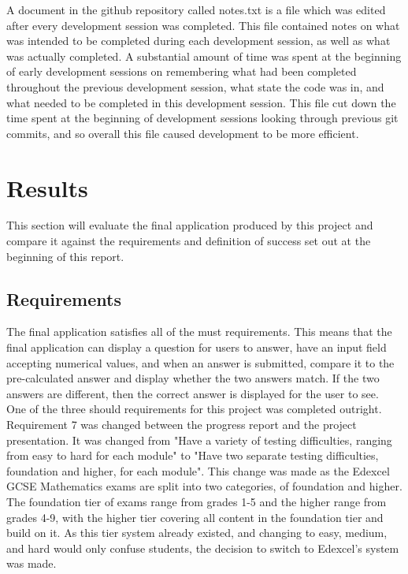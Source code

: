 \documentclass{article}
\begin{document}
A document in the github repository called notes.txt is a file which was edited after every development session was completed. This file contained notes on what was intended to be completed during each development session, as well as what was actually completed. A substantial amount of time was spent at the beginning of early development sessions on remembering what had been completed throughout the previous development session, what state the code was in, and what needed to be completed in this development session. This file cut down the time spent at the beginning of development sessions looking through previous git commits, and so overall this file caused development to be more efficient. \\




\section{Results}
\label{section:results}

This section will evaluate the final application produced by this project and compare it against the requirements and definition of success set out at the beginning of this report. 

\subsection{Requirements}

The final application satisfies all of the must requirements. This means that the final application can display a question for users to answer, have an input field accepting numerical values, and when an answer is submitted, compare it to the pre-calculated answer and display whether the two answers match. If the two answers are different, then the correct answer is displayed for the user to see. \\

One of the three should requirements for this project was completed outright. Requirement 7 was changed between the progress report and the project presentation. It was changed from "Have a variety of testing difficulties, ranging from easy to hard for each module" to "Have two separate testing difficulties, foundation and higher, for each module". This change was made as the Edexcel GCSE Mathematics exams are split into two categories, of foundation and higher. The foundation tier of exams range from grades 1-5 and the higher range from grades 4-9, with the higher tier covering all content in the foundation tier and build on it. As this tier system already existed, and changing to easy, medium, and hard would only confuse students, the decision to switch to Edexcel's system was made. \\
\end{document}
